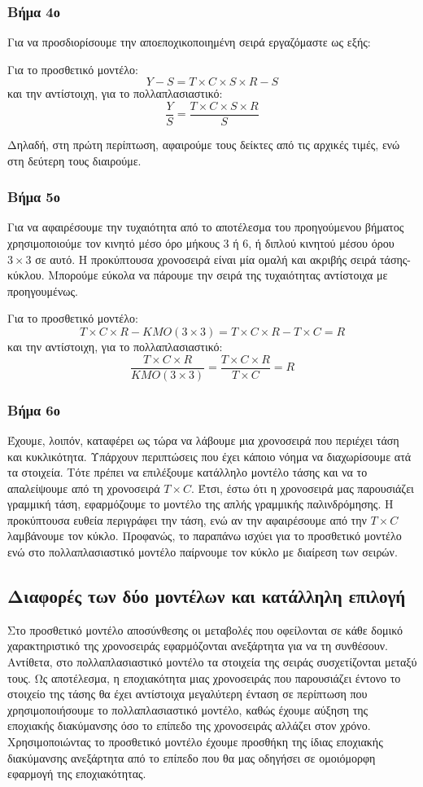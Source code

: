 \subsubsection{Βήμα 4ο}
Για να προσδιορίσουμε την αποεποχικοποιημένη σειρά εργαζόμαστε ως εξής:

Για το προσθετικό μοντέλο:
\[Y - S= T\times C\times S\times R - S \]
και την αντίστοιχη, για το πολλαπλασιαστικό:
\[\frac{Y}{S}= \frac{T\times C\times S\times R}{S} \]

Δηλαδή, στη πρώτη περίπτωση, αφαιρούμε τους δείκτες από τις αρχικές τιμές, ενώ στη δεύτερη τους διαιρούμε.

\subsubsection{Βήμα 5ο}
Για να αφαιρέσουμε την τυχαιότητα από το αποτέλεσμα του προηγούμενου βήματος χρησιμοποιούμε τον κινητό μέσο όρο μήκους 3 ή 6, ή διπλού κινητού μέσου όρου $3\times3$ σε αυτό. Η προκύπτουσα χρονοσειρά  είναι μία ομαλή και ακριβής σειρά τάσης-κύκλου. Μπορούμε εύκολα να πάρουμε την σειρά της τυχαιότητας αντίστοιχα με προηγουμένως.

Για το προσθετικό μοντέλο:
\[T\times C\times R - KMO(3\times3) = T\times C\times R - T\times C = R  \]
και την αντίστοιχη, για το πολλαπλασιαστικό:
\[\frac{T\times C\times R}{KMO(3\times3)}= \frac{T\times C\times R}{T\times C} = R  \]

\subsubsection{Βήμα 6ο}
Έχουμε, λοιπόν, καταφέρει ως τώρα να λάβουμε μια χρονοσειρά που περιέχει τάση και κυκλικότητα. Υπάρχουν περιπτώσεις που έχει κάποιο νόημα να διαχωρίσουμε ατά τα στοιχεία. Τότε πρέπει να επιλέξουμε κατάλληλο μοντέλο τάσης και να το απαλείψουμε από τη χρονοσειρά $T\times C$. Έτσι, έστω ότι η χρονοσειρά μας παρουσιάζει γραμμική τάση, εφαρμόζουμε το μοντέλο της απλής γραμμικής παλινδρόμησης. Η προκύπτουσα ευθεία περιγράφει την τάση, ενώ αν την αφαιρέσουμε από την $T \times C$ λαμβάνουμε τον κύκλο. Προφανώς, το παραπάνω ισχύει για το προσθετικό μοντέλο ενώ στο πολλαπλασιαστικό μοντέλο παίρνουμε τον κύκλο με διαίρεση των σειρών. 



\subsection{Διαφορές των δύο μοντέλων και κατάλληλη επιλογή}
Στο προσθετικό μοντέλο αποσύνθεσης οι μεταβολές που οφείλονται σε κάθε δομικό χαρακτηριστικό της χρονοσειράς εφαρμόζονται ανεξάρτητα για να τη συνθέσουν. Αντίθετα, στο πολλαπλασιαστικό μοντέλο τα στοιχεία της σειράς συσχετίζονται μεταξύ τους. Ως αποτέλεσμα, η εποχιακότητα μιας χρονοσειράς που παρουσιάζει έντονο το στοιχείο της τάσης θα έχει αντίστοιχα μεγαλύτερη ένταση σε περίπτωση που χρησιμοποιήσουμε το πολλαπλασιαστικό μοντέλο, καθώς έχουμε αύξηση της εποχιακής διακύμανσης όσο το επίπεδο της χρονοσειράς αλλάζει στον χρόνο. Χρησιμοποιώντας το προσθετικό μοντέλο έχουμε προσθήκη της ίδιας εποχιακής διακύμανσης ανεξάρτητα από το επίπεδο που θα μας οδηγήσει σε ομοιόμορφη εφαρμογή της εποχιακότητας. 


